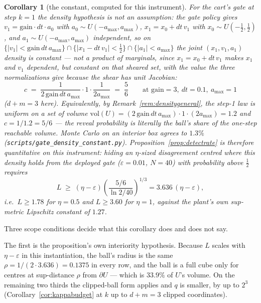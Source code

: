 \documentclass[11pt]{article}
\newtheorem{corollary}{Corollary}
\theoremstyle{definition}
\theoremstyle{remark}
\begin{document}
\begin{corollary}[the constant, computed for this instrument]
\label{cor:cartdensity}
For the cart's gate at step $k=1$ the density hypothesis is not an assumption: the gate policy gives $v_1 = \mathrm{gain}\cdot dt\cdot a_0$ with $a_0 \sim U(-a_{\max}, a_{\max})$, $x_1 = x_0 + dt\,v_1$ with $x_0 \sim U(-\tfrac12,\tfrac12)$, and $a_1 \sim U(-a_{\max},a_{\max})$ independent, so on $\{|v_1| < \mathrm{gain}\,dt\,a_{\max}\} \cap \{|x_1 - dt\,v_1| < \tfrac12\} \cap \{|a_1| < a_{\max}\}$ the joint $(x_1,v_1,a_1)$ density is \emph{constant} --- not a product of marginals, since $x_1 = x_0 + dt\,v_1$ makes $x_1$ and $v_1$ dependent, but constant on that sheared set, with the value the three normalizations give because the shear has unit Jacobian:
\[
  c \;=\; \frac{1}{2\,\mathrm{gain}\,dt\,a_{\max}} \cdot 1 \cdot \frac{1}{2 a_{\max}} \;=\; \frac{5}{6}
  \qquad\text{at } \mathrm{gain} = 3,\ dt = 0.1,\ a_{\max} = 1
\]
($d + m = 3$ here). Equivalently, by Remark~\ref{rem:densitygeneral}, the step-1 law is uniform on a set of volume $\mathrm{vol}(U) = (2\,\mathrm{gain}\,dt\,a_{\max}) \cdot 1 \cdot (2a_{\max}) = 1.2$ and $c = 1/1.2 = 5/6$ --- the reveal probability is literally the ball's share of the one-step reachable volume. Monte Carlo on an interior box agrees to $1.3\%$ (\texttt{scripts/\allowbreak gate\_\allowbreak density\_\allowbreak constant.py}). Proposition~\ref{prop:detectrate} is therefore quantitative on this instrument: hiding an $\eta$-sized disagreement \emph{centred where this density holds} from the deployed gate ($\varepsilon = 0.01$, $N = 40$) with probability above $\tfrac12$ requires
\[
  L \;\geq\; (\eta - \varepsilon)\left(\frac{5/6}{\ln 2 / 40}\right)^{1/3} = 3.636\,(\eta - \varepsilon),
\]
i.e.\ $L \geq 1.78$ for $\eta = 0.5$ and $L \geq 3.60$ for $\eta = 1$, against the plant's own sup-metric Lipschitz constant of $1.27$.
\end{corollary}

Three scope conditions decide what this corollary does and does not say.

The first is the proposition's own interiority hypothesis. Because $L$ scales with $\eta - \varepsilon$ in this instantiation, the ball's radius is the same $\rho = 1/(2 \cdot 3.636) = 0.1375$ in every row, and the ball is a full cube only for centres at sup-distance $\rho$ from $\partial U$ --- which is $33.9\%$ of $U$'s volume. On the remaining two thirds the clipped-ball form applies and $q$ is smaller, by up to $2^{3}$ (Corollary~\ref{cor:kappabudget} at $k$ up to $d+m = 3$ clipped coordinates).
\end{document}
